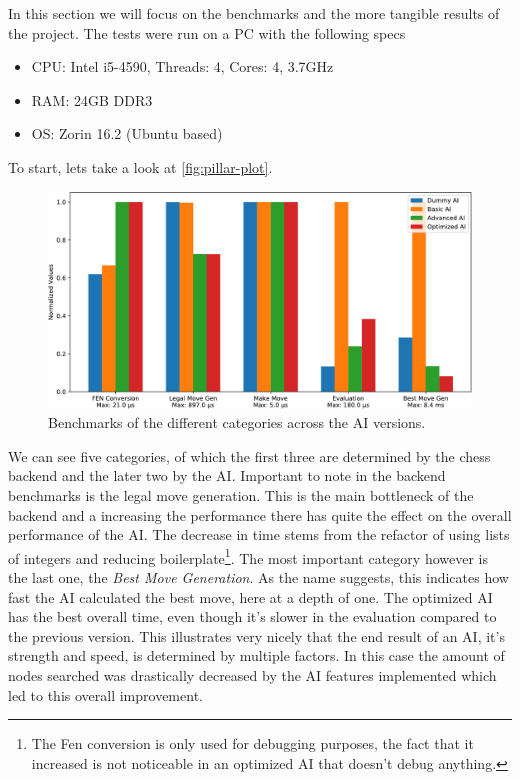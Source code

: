 In this section we will focus on the benchmarks
and the more tangible results of the project.
The tests were run on a PC with the following specs

\begin{itemize}
  \item CPU: Intel i5-4590, Threads: 4, Cores: 4, 3.7GHz
  \item RAM: 24GB DDR3
  \item OS: Zorin 16.2 (Ubuntu based)
\end{itemize}

To start, lets take a look at \autoref{fig:pillar-plot}.

\begin{figure}[hbtp]
	\centering
	\includegraphics[width=.9\linewidth, page=1]{reference/pics/plot.pdf}
	\caption{Benchmarks of the different categories across the AI versions.}
	\label{fig:pillar-plot}
\end{figure}

We can see five categories, of which the first three
are determined by the chess backend and the later two
by the AI.
Important to note in the backend benchmarks is the legal move
generation. This is the main bottleneck of the backend
and a increasing the performance there has quite
the effect on the overall performance of the AI.
The decrease in time stems from the refactor of using
lists of integers and reducing boilerplate\footnote{
The Fen conversion is only used for debugging
purposes, the fact that it increased is not noticeable
in an optimized AI that doesn't debug anything.}.
The most important category however is the last one,
the \textit{Best Move Generation}. As the name suggests,
this indicates how fast the AI calculated the best move,
here at a depth of one.
The optimized AI has the best overall time,
even though it's slower in the evaluation compared to
the previous version. This illustrates very nicely
that the end result of an AI, it's strength and speed,
is determined by multiple factors. In this case
the amount of nodes searched was drastically decreased
by the AI features implemented which led to this
overall improvement.

